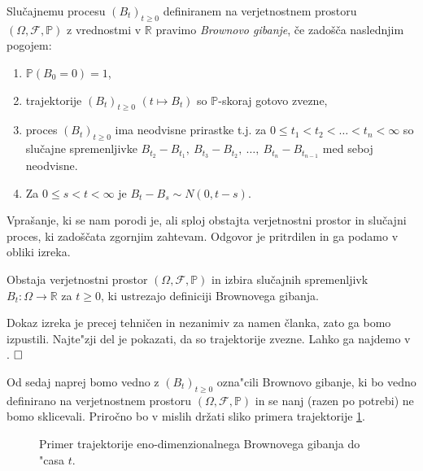 \documentclass[twoside,11pt]{article}
\begin{document}
\pagebreak

\begin{definicija}
    Slučajnemu procesu $(B_t)_{t\geq 0}$ definiranem na verjetnostnem prostoru $(\Omega, \mathcal{F}, \mathbb{P})$
    z vrednostmi v $\mathbb{R}$ pravimo \textit{Brownovo gibanje}, če 
    zadošča naslednjim pogojem:
    \begin{enumerate}
        \item $\mathbb{P}(B_0 = 0) = 1$,
        \item trajektorije $(B_t)_{t\geq0}$ $(t \mapsto B_t)$ so $\mathbb{P}$-skoraj gotovo zvezne,
        \item proces $\left(B_t\right)_{t \geq 0}$ ima neodvisne prirastke t.j. za $0 \leq t_1 < t_2 < \ldots < t_n < \infty$ so slučajne spremenljivke
            $B_{t_2} - B_{t_1}, \ B_{t_3} - B_{t_2}, \ \ldots, \ B_{t_n} - B_{t_{n-1}}$ med seboj neodvisne. 
        \item Za $ 0 \leq s < t < \infty$ je $B_t - B_s \sim N(0, t-s)$.
    \end{enumerate}
\end{definicija}
        
Vprašanje, ki se nam porodi je, ali sploj obstajta verjetnostni prostor 
in slučajni proces, ki zadoščata zgornjim zahtevam. Odgovor je pritrdilen in ga 
podamo v obliki izreka.

\begin{izrek}
    Obstaja verjetnostni prostor $(\Omega, \mathcal{F}, \mathbb{P})$ in
    izbira slučajnih spremenljivk $B_t : \Omega \to \mathbb{R}$ za $t \geq 0$,
    ki ustrezajo definiciji Brownovega gibanja.
\end{izrek}

\begin{dokaz}
    Dokaz izreka je precej tehničen in nezanimiv za namen članka, zato ga bomo izpustili. Najte"zji del je 
    pokazati, da so trajektorije zvezne. Lahko ga najdemo v \cite{1}. $\hfill \square$
\end{dokaz}


Od sedaj naprej bomo vedno z $(B_t)_{t\geq 0}$ ozna"cili Brownovo gibanje, ki bo vedno definirano na 
verjetnostnem prostoru $(\Omega, \mathcal{F}, \mathbb{P})$ in se nanj (razen po potrebi) ne 
bomo sklicevali. Priročno bo v mislih držati sliko primera trajektorije  \ref{fig:slika2}.

\begin{figure}[h]
    \centering
    \caption{Primer trajektorije eno-dimenzionalnega Brownovega gibanja do "casa $t$.}
    \label{fig:slika2}
\end{figure}
\end{document}
